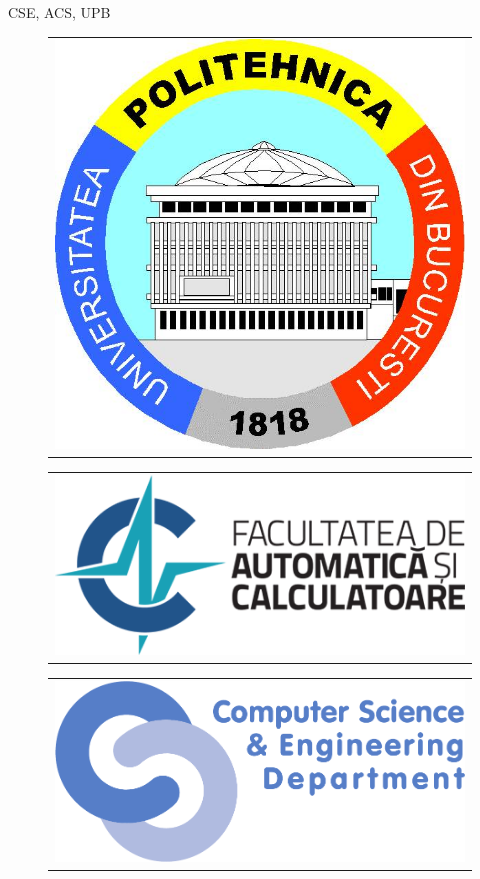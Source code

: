 \documentclass{simple}
\begin{document}
\begin{frame}{CSE, ACS, UPB}
  \begin{figure}
    \begin{minipage}[b]{0.3\linewidth}
      \centering
      \begin{tabular}{c}
        \includegraphics[width=0.7\linewidth]{img/UPB-logo} \\
      \end{tabular}
    \end{minipage}
    \hspace{0.3cm}
    \begin{minipage}[b]{0.3\linewidth}
      \begin{tabular}{c}
        \includegraphics[width=0.7\linewidth]{img/ACS-logo} \\
      \end{tabular}
    \end{minipage}
    \hspace{0.3cm}
    \begin{minipage}[b]{0.3\linewidth}
      \begin{tabular}{c}
        \includegraphics[width=0.7\linewidth]{img/CSE-logo} \\
      \end{tabular}
    \end{minipage}
  \end{figure}
\end{frame}
\end{document}
